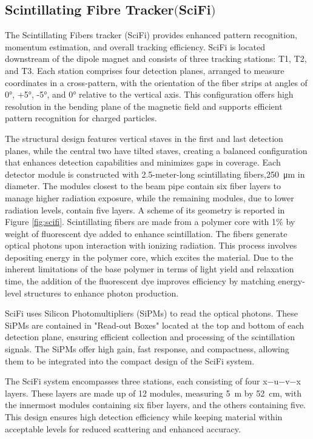 \subsection[Scintillating Fibre Tracker]{Scintillating Fibre Tracker$ \bigl($SciFi$\bigr)$}
The Scintillating Fibers tracker (SciFi)\cite{scifi} provides enhanced pattern recognition, momentum estimation, and overall tracking efficiency.
SciFi is located downstream of the dipole magnet and consists of three tracking stations: T1, T2, and T3. Each station comprises four detection planes, arranged to measure coordinates in a cross-pattern, with the orientation of the fiber strips at angles of 0°, +5°, -5°, and 0° relative to the vertical axis. This configuration offers high resolution in the bending plane of the magnetic field and supports efficient pattern recognition for charged particles.

The structural design features vertical staves in the first and last detection planes, while the central two have tilted staves, creating a balanced configuration that enhances detection capabilities and minimizes gaps in coverage. Each detector module is constructed with 2.5-meter-long scintillating fibers,\SI{250}{\micro\meter} in diameter. The modules closest to the beam pipe contain six fiber layers to manage higher radiation exposure, while the remaining modules, due to lower radiation levels, contain five layers.
A scheme of its geometry is reported in Figure \ref{fig:scifi}.
Scintillating fibers are made from a polymer core with 1\% by weight of fluorescent dye added to enhance scintillation. The fibers generate optical photons upon interaction with ionizing radiation. This process involves depositing energy in the polymer core, which excites the material. Due to the inherent limitations of the base polymer in terms of light yield and relaxation time, the addition of the fluorescent dye improves efficiency by matching energy-level structures to enhance photon production.

SciFi uses Silicon Photomultipliers (SiPMs) to read the optical photons. These SiPMs are contained in "Read-out Boxes" located at the top and bottom of each detection plane, ensuring efficient collection and processing of the scintillation signals. The SiPMs offer high gain, fast response, and compactness, allowing them to be integrated into the compact design of the SciFi system.

The SciFi system encompasses three stations, each consisting of four x−u−v−x layers. These layers are made up of 12 modules, measuring \SI{5}{\meter} by \SI{52}{\centi\meter}, with the innermost modules containing six fiber layers, and the others containing five. This design ensures high detection efficiency while keeping material within acceptable levels for reduced scattering and enhanced accuracy.

